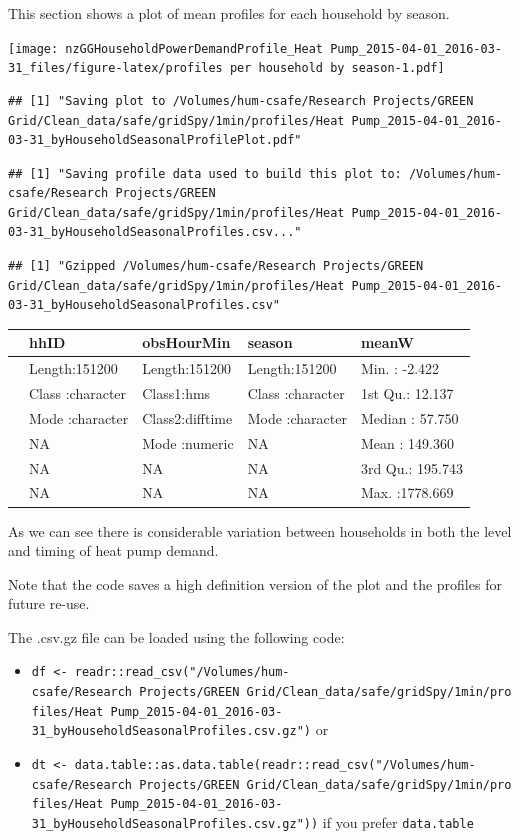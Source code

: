 \documentclass[]{article}
\providecommand{\tightlist}{%
  \setlength{\itemsep}{0pt}\setlength{\parskip}{0pt}}
\begin{document}
This section shows a plot of mean profiles for each household by season.

\texttt{[image: nzGGHouseholdPowerDemandProfile\_Heat Pump\_2015-04-01\_2016-03-31\_files/figure-latex/profiles per household by season-1.pdf]}

\begin{verbatim}
## [1] "Saving plot to /Volumes/hum-csafe/Research Projects/GREEN Grid/Clean_data/safe/gridSpy/1min/profiles/Heat Pump_2015-04-01_2016-03-31_byHouseholdSeasonalProfilePlot.pdf"
\end{verbatim}

\begin{verbatim}
## [1] "Saving profile data used to build this plot to: /Volumes/hum-csafe/Research Projects/GREEN Grid/Clean_data/safe/gridSpy/1min/profiles/Heat Pump_2015-04-01_2016-03-31_byHouseholdSeasonalProfiles.csv..."
\end{verbatim}

\begin{verbatim}
## [1] "Gzipped /Volumes/hum-csafe/Research Projects/GREEN Grid/Clean_data/safe/gridSpy/1min/profiles/Heat Pump_2015-04-01_2016-03-31_byHouseholdSeasonalProfiles.csv"
\end{verbatim}

\begin{longtable}[]{@{}lllll@{}}
\toprule
& hhID & obsHourMin & season & meanW\tabularnewline
\midrule
\endhead
& Length:151200 & Length:151200 & Length:151200 & Min. :
-2.422\tabularnewline
& Class :character & Class1:hms & Class :character & 1st Qu.:
12.137\tabularnewline
& Mode :character & Class2:difftime & Mode :character & Median :
57.750\tabularnewline
& NA & Mode :numeric & NA & Mean : 149.360\tabularnewline
& NA & NA & NA & 3rd Qu.: 195.743\tabularnewline
& NA & NA & NA & Max. :1778.669\tabularnewline
\bottomrule
\end{longtable}

As we can see there is considerable variation between households in both
the level and timing of heat pump demand.

Note that the code saves a high definition version of the plot and the
profiles for future re-use.

The .csv.gz file can be loaded using the following code:

\begin{itemize}
\tightlist
\item
  \texttt{df\ \textless{}-\ readr::read\_csv("/Volumes/hum-csafe/Research\ Projects/GREEN\ Grid/Clean\_data/safe/gridSpy/1min/profiles/Heat\ Pump\_2015-04-01\_2016-03-31\_byHouseholdSeasonalProfiles.csv.gz")}
  or
\item
  \texttt{dt\ \textless{}-\ data.table::as.data.table(readr::read\_csv("/Volumes/hum-csafe/Research\ Projects/GREEN\ Grid/Clean\_data/safe/gridSpy/1min/profiles/Heat\ Pump\_2015-04-01\_2016-03-31\_byHouseholdSeasonalProfiles.csv.gz"))}
  if you prefer \texttt{data.table}
\end{itemize}
\end{document}
